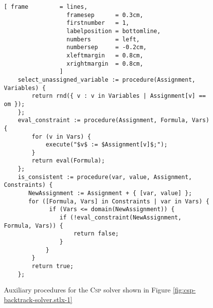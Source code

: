 \begin{figure}[!ht]
\centering
\begin{Verbatim}[ frame         = lines, 
                  framesep      = 0.3cm, 
                  firstnumber   = 1,
                  labelposition = bottomline,
                  numbers       = left,
                  numbersep     = -0.2cm,
                  xleftmargin   = 0.8cm,
                  xrightmargin  = 0.8cm,
                ]
    select_unassigned_variable := procedure(Assignment, Variables) {
        return rnd({ v : v in Variables | Assignment[v] == om });
    };
    eval_constraint := procedure(Assignment, Formula, Vars) {
        for (v in Vars) {
            execute("$v$ := $Assignment[v]$;");
        }
        return eval(Formula);
    };
    is_consistent := procedure(var, value, Assignment, Constraints) {
       NewAssignment := Assignment + { [var, value] };
       for ([Formula, Vars] in Constraints | var in Vars) {
             if (Vars <= domain(NewAssignment)) {
                if (!eval_constraint(NewAssignment, Formula, Vars)) {
                    return false;
                }
            }
        }
        return true;
    };
\end{Verbatim}
\vspace*{-0.3cm}
\caption{Auxiliary procedures for the \textsc{Csp} solver shown in Figure \ref{fig:csp-backtrack-solver.stlx-1}}
\label{fig:csp-backtrack-solver.stlx-2}
\end{figure}

